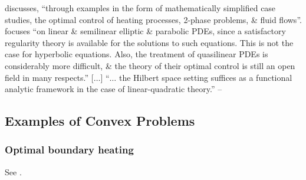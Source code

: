 \documentclass[oneside]{book}
\numberwithin{equation}{section}
\begin{document}
\cite{Troltzsch2010} discusses, ``through examples in the form of mathematically simplified case studies, the optimal control of heating processes, 2-phase problems, \& fluid flows''. \cite{Troltzsch2010} focuses ``on linear \& semilinear elliptic \& parabolic PDEs, since a satisfactory regularity theory is available for the solutions to such equations. This is not the case for hyperbolic equations. Also, the treatment of quasilinear PDEs is considerably more difficult, \& the theory of their optimal control is still an open field in many respects.'' [$\ldots$] ``$\ldots$ the Hilbert space setting suffices as a functional analytic framework in the case of linear-quadratic theory.'' -- \cite[p. 3]{Troltzsch2010}

\subsection{Examples of Convex Problems}

\subsubsection{Optimal boundary heating}
See \cite[Subsect. 1.2.1, pp. 3--5]{Troltzsch2010}.
\end{document}
